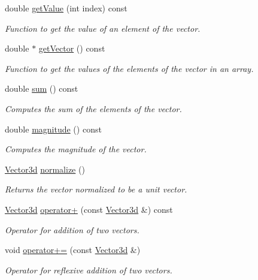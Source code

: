\begin{DoxyCompactItemize}
double \hyperlink{classVector3d_a114fda84a6723e54678d9dde244725a4}{get\-Value} (int index) const 
\begin{DoxyCompactList}\small\item\em \-Function to get the value of an element of the vector. \end{DoxyCompactList}\item 
double $\ast$ \hyperlink{classVector3d_aae41ae56c3c37a6a7ecb4762abf8cbf4}{get\-Vector} () const 
\begin{DoxyCompactList}\small\item\em \-Function to get the values of the elements of the vector in an array. \end{DoxyCompactList}\item 
double \hyperlink{classVector3d_ae27b1ede7f5be29d80d95099f2ef3e23}{sum} () const 
\begin{DoxyCompactList}\small\item\em \-Computes the sum of the elements of the vector. \end{DoxyCompactList}\item 
double \hyperlink{classVector3d_adeda019b2d7ee805dece85650bdf6ed6}{magnitude} () const 
\begin{DoxyCompactList}\small\item\em \-Computes the magnitude of the vector. \end{DoxyCompactList}\item 
\hyperlink{classVector3d}{\-Vector3d} \hyperlink{classVector3d_a24acba00068d9d1612404243f2a01078}{normalize} ()
\begin{DoxyCompactList}\small\item\em \-Returns the vector normalized to be a unit vector. \end{DoxyCompactList}\item 
\hyperlink{classVector3d}{\-Vector3d} \hyperlink{classVector3d_ad714ad56910f370335c18262dc5cc13a}{operator+} (const \hyperlink{classVector3d}{\-Vector3d} \&) const 
\begin{DoxyCompactList}\small\item\em \-Operator for addition of two vectors. \end{DoxyCompactList}\item 
void \hyperlink{classVector3d_a034e9f847d613c9cba1cb47202b8143a}{operator+=} (const \hyperlink{classVector3d}{\-Vector3d} \&)
\begin{DoxyCompactList}\small\item\em \-Operator for reflexive addition of two vectors. \end{DoxyCompactList}\item 

\end{DoxyCompactItemize}
